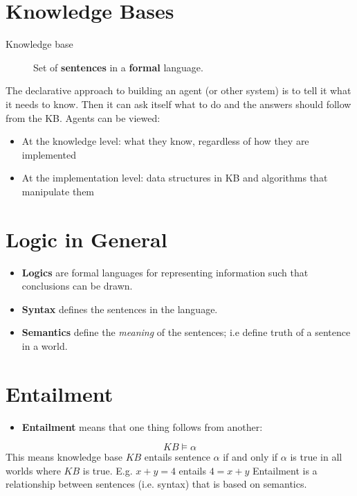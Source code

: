 \documentclass[11pt]{article}
\begin{document}
\section{Knowledge Bases}
\label{sec:org21b6bcd}
\begin{description}
\item[{Knowledge base}] Set of \textbf{sentences} in a \textbf{formal} language.
\end{description}
The declarative approach to building an agent (or other system) is to tell it what it needs to know.
Then it can ask itself what to do and the answers should follow from the KB.
Agents can be viewed:
\begin{itemize}
\item At the knowledge level: what they know, regardless of how they are implemented
\item At the implementation level: data structures in KB and algorithms that manipulate them
\end{itemize}

\section{Logic in General}
\label{sec:org687c359}
\begin{itemize}
\item \textbf{Logics} are formal languages for representing information such that conclusions can be drawn.
\item \textbf{Syntax} defines the sentences in the language.
\item \textbf{Semantics} define the \emph{meaning} of the sentences; i.e define truth of a sentence in a world.
\end{itemize}

\section{Entailment}
\label{sec:org34b83f8}
\begin{itemize}
\item \textbf{Entailment} means that one thing follows from another:
\end{itemize}
\begin{equation}
KB \models \alpha
\end{equation}
This means knowledge base \(KB\) entails sentence \(\alpha\) if and only if \(\alpha\) is true in all worlds where \(KB\) is true.
E.g. \(x + y = 4\) entails \(4 = x + y\)
Entailment is a relationship between sentences (i.e. syntax) that is based on semantics.
\end{document}
